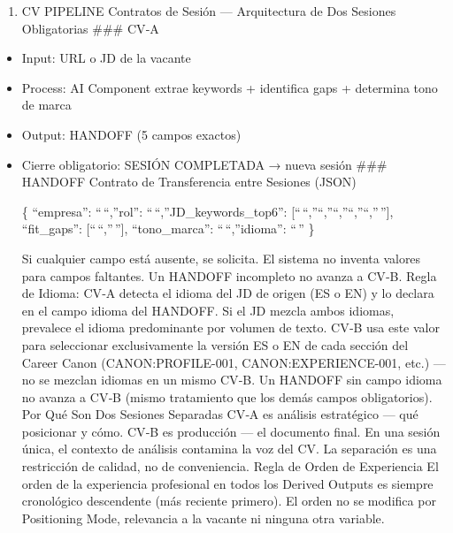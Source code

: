 \documentclass[
]{article}
\providecommand{\tightlist}{%
  \setlength{\itemsep}{0pt}\setlength{\parskip}{0pt}}
\begin{document}
\begin{enumerate}
  \begin{center}\rule{0.5\linewidth}{0.5pt}\end{center}

  \subsection{KERNEL:CV-PIPELINE}\label{kernelcv-pipeline}
\item
  CV PIPELINE Contratos de Sesión --- Arquitectura de Dos Sesiones
  Obligatorias \#\#\# CV‑A
\end{enumerate}

\begin{itemize}
\tightlist
\item
  Input: URL o JD de la vacante
\item
  Process: AI Component extrae keywords + identifica gaps + determina
  tono de marca
\item
  Output: HANDOFF (5 campos exactos)
\item
  Cierre obligatorio: SESIÓN COMPLETADA → nueva sesión \#\#\# HANDOFF
  Contrato de Transferencia entre Sesiones (JSON)

  \{ ``empresa'': ``\,``,''rol'': ``\,``,''JD\_keywords\_top6'':
  {[}``\,``,''``,''``,''``,''``,''\,''{]}, ``fit\_gaps'':
  {[}``\,``,''\,''{]}, ``tono\_marca'': ``\,``,''idioma'': ``\,'' \}

  Si cualquier campo está ausente, se solicita. El sistema no inventa
  valores para campos faltantes. Un HANDOFF incompleto no avanza a CV‑B.
  Regla de Idioma: CV‑A detecta el idioma del JD de origen (ES o EN) y
  lo declara en el campo idioma del HANDOFF. Si el JD mezcla ambos
  idiomas, prevalece el idioma predominante por volumen de texto. CV‑B
  usa este valor para seleccionar exclusivamente la versión ES o EN de
  cada sección del Career Canon (CANON:PROFILE-001,
  CANON:EXPERIENCE-001, etc.) --- no se mezclan idiomas en un mismo
  CV‑B. Un HANDOFF sin campo idioma no avanza a CV‑B (mismo tratamiento
  que los demás campos obligatorios). Por Qué Son Dos Sesiones Separadas
  CV‑A es análisis estratégico --- qué posicionar y cómo. CV‑B es
  producción --- el documento final. En una sesión única, el contexto de
  análisis contamina la voz del CV. La separación es una restricción de
  calidad, no de conveniencia. Regla de Orden de Experiencia El orden de
  la experiencia profesional en todos los Derived Outputs es siempre
  cronológico descendente (más reciente primero). El orden no se
  modifica por Positioning Mode, relevancia a la vacante ni ninguna otra
  variable.


\end{itemize}
\end{document}

